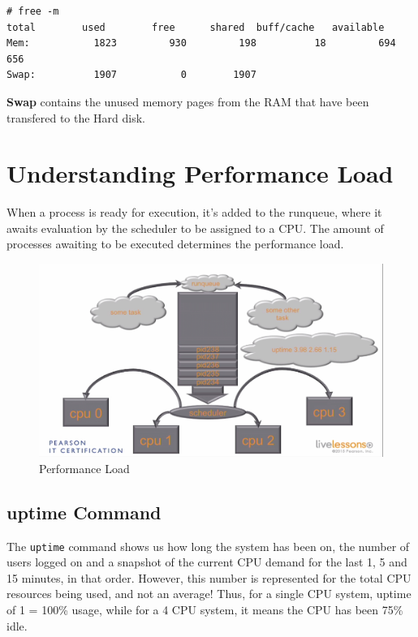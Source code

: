 \vspace{-15pt}
\begin{verbatim}
# free -m
total        used        free      shared  buff/cache   available
Mem:           1823         930         198          18         694         656
Swap:          1907           0        1907
\end{verbatim}
\vspace{-10pt}

\textbf{Swap} contains the unused memory pages from the RAM that have been transfered to the Hard disk. 

	\section{Understanding Performance Load}
When a process is ready for execution, it's added to the runqueue, where it awaits evaluation by the scheduler to be assigned to a CPU. The amount of processes awaiting to be executed determines the performance load. 

\begin{figure}[H]
	\centering
	\includegraphics[width=0.9\linewidth]{Mod2/chapters/2.10.a}
	\caption{Performance Load}
	\label{fig:2}
\end{figure}

\subsection{uptime Command}
The \verb|uptime| command shows us how long the system has been on, the number of users logged on and a snapshot of the current CPU demand for the last 1, 5 and 15 minutes, in that order. However, this number is represented for the total CPU resources being used, and not an average! Thus, for a single CPU system, uptime of 1 = 100\% usage, while for a 4 CPU system, it means the CPU has been 75\% idle. 

